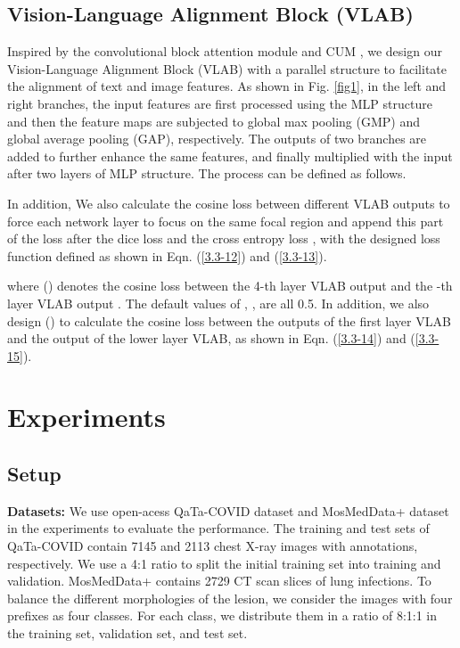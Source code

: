 \documentclass{article}
\begin{document}
\vspace{-5mm}
\subsection{Vision-Language Alignment Block (VLAB)}
\vspace{-2mm}
Inspired by the convolutional block attention module \cite{li2022tfcns} and CUM \cite{li2022semi}, we design our Vision-Language Alignment Block (VLAB) with a parallel structure to facilitate the alignment of text and image features. As shown in Fig. \ref{fig1}, in the left and right branches, the input features are first processed using the MLP structure and then the feature maps are subjected to global max pooling (GMP) and global average pooling (GAP), respectively. The outputs of two branches are added to further enhance the same features, and finally multiplied with the input after two layers of MLP structure. The process can be defined as follows.
\vspace{-2mm}

In addition, We also calculate the cosine loss between different VLAB outputs to force each network layer to focus on the same focal region and append this part of the loss after the dice loss  and the cross entropy loss , with the designed loss function defined as shown in Eqn. (\ref{3.3-12}) and (\ref{3.3-13}).
\vspace{-2mm}

where  () denotes the cosine loss between the 4-th layer VLAB output  and the -th layer VLAB output . The default values of , ,  are all 0.5. In addition, we also design  () to calculate the cosine loss between the outputs of the first layer VLAB and the output of the lower layer VLAB, as shown in Eqn. (\ref{3.3-14}) and (\ref{3.3-15}).
\vspace{-2mm}




\vspace{-3mm}
\section{Experiments}
\label{sec:experiments}
\vspace{-3mm}
\subsection{Setup}
\vspace{-2mm}
\noindent\textbf{Datasets:} We use open-acess QaTa-COVID dataset \cite{yamac2021convolutional} and MosMedData+ dataset \cite{morozov2020mosmeddata,COVID-19-CT} in the experiments to evaluate the performance. The training and test sets of QaTa-COVID contain 7145 and 2113 chest X-ray images with annotations, respectively. We use a 4:1 ratio to split the initial training set into training and validation. MosMedData+ contains 2729 CT scan slices of lung infections. To balance the different morphologies of the lesion, we consider the images with four prefixes as four classes. For each class, we distribute them in a ratio of 8:1:1 in the training set, validation set, and test set.
\end{document}
